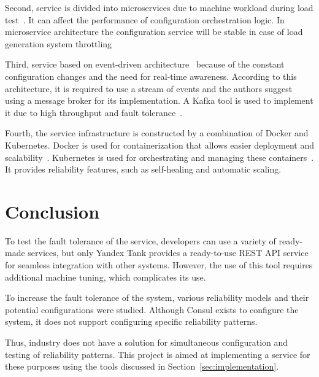 Second, service is divided into microservices due to machine workload during load test~\cite{load_testing_tips}.
It can affect the performance of configuration orchestration logic.
In microservice architecture the configuration service will be stable in case of load generation system throttling

Third, service based on event-driven architecture~\cite{event_driven} because of the constant configuration changes and the need for real-time awareness.
According to this architecture, it is required to use a stream of events and the authors suggest using a message broker for its implementation.
A Kafka tool is used to implement it due to high throughput and fault tolerance~\cite{kafka_choose}.

Fourth, the service infrastructure is constructed by a combination of Docker and Kubernetes.
Docker is used for containerization that allows easier deployment and scalability~\cite{docker_start}.
Kubernetes is used for orchestrating and managing these containers~\cite{kubernetes}.
It provides reliability features, such as self-healing and automatic scaling.

\section{Conclusion}\label{sec:review_conclusion}
To test the fault tolerance of the service, developers can use a variety of ready-made services, but only Yandex Tank provides a ready-to-use REST API service for seamless integration with other systems.
However, the use of this tool requires additional machine tuning, which complicates its use.

To increase the fault tolerance of the system, various reliability models and their potential configurations were studied.
Although Consul exists to configure the system, it does not support configuring specific reliability patterns.

Thus, industry does not have a solution for simultaneous configuration and testing of reliability patterns.
This project is aimed at implementing a service for these purposes using the tools discussed in Section~\ref{sec:implementation}.
